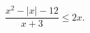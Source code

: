 \begin{ex}[type=inequality]
	\begin{condition}
		$ \dfrac{x^2 - |x| - 12}{x + 3}\leqslant 2x.$
	\end{condition}
\end{ex}